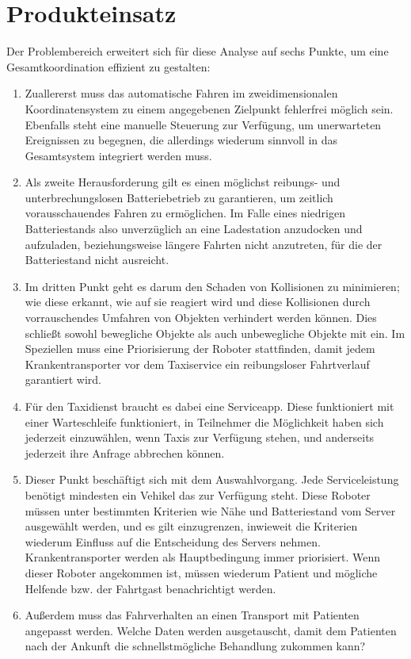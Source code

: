 
	\section{Produkteinsatz}

	Der Problembereich erweitert sich für diese Analyse auf sechs Punkte, um eine Gesamtkoordination effizient zu gestalten:\\

\begin{enumerate}
	\item Zuallererst muss das automatische Fahren im zweidimensionalen Koordinatensystem zu einem angegebenen Zielpunkt fehlerfrei möglich sein. 
	Ebenfalls steht eine manuelle Steuerung zur Verfügung, um unerwarteten Ereignissen zu begegnen, die allerdings wiederum sinnvoll in das Gesamtsystem integriert werden muss.
	\item Als zweite Herausforderung gilt es einen möglichst reibungs- und unterbrechungslosen Batteriebetrieb zu garantieren, um zeitlich vorausschauendes Fahren zu ermöglichen. 
	Im Falle eines niedrigen Batteriestands also unverzüglich an eine Ladestation anzudocken und aufzuladen, beziehungsweise längere Fahrten nicht anzutreten, für die der Batteriestand nicht ausreicht.
	\item Im dritten Punkt geht es darum den Schaden von Kollisionen zu minimieren; wie diese erkannt, wie auf sie reagiert wird und diese Kollisionen durch vorrauschendes Umfahren von Objekten verhindert werden können. 
	Dies schließt sowohl bewegliche Objekte als auch unbewegliche Objekte mit ein. 
	Im Speziellen muss eine Priorisierung der Roboter stattfinden, damit jedem Krankentransporter vor dem Taxiservice ein reibungsloser Fahrtverlauf garantiert wird.
	\item Für den Taxidienst braucht es dabei eine Serviceapp. Diese funktioniert mit einer Warteschleife funktioniert, in Teilnehmer die Möglichkeit haben sich jederzeit einzuwählen, wenn Taxis zur Verfügung stehen, und anderseits jederzeit ihre Anfrage abbrechen können.
	\item Dieser Punkt beschäftigt sich mit dem Auswahlvorgang.
	Jede Serviceleistung benötigt mindesten ein Vehikel das zur Verfügung steht. 
	Diese Roboter müssen unter bestimmten Kriterien wie Nähe und Batteriestand vom Server ausgewählt werden, und es gilt einzugrenzen, inwieweit die Kriterien wiederum Einfluss auf die Entscheidung des Servers nehmen. Krankentransporter werden als Hauptbedingung immer priorisiert.
		Wenn dieser Roboter angekommen ist, müssen wiederum Patient und mögliche Helfende bzw. der Fahrtgast benachrichtigt werden.
	\item Außerdem muss das Fahrverhalten an einen Transport mit Patienten angepasst werden. 
	Welche Daten werden ausgetauscht, damit dem Patienten nach der Ankunft die schnellstmögliche Behandlung zukommen kann?
\end{enumerate}


